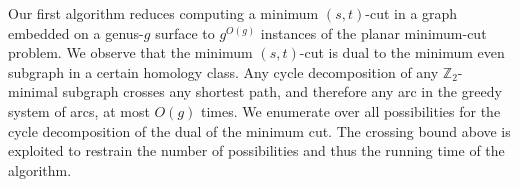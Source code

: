 \documentclass[natbib]{svcyclop}
\def\Z{\mathbb{Z}}
\begin{document}

Our first algorithm \cite{cen-mcshc-09} reduces computing a minimum $(s,t)$-cut in a graph embedded on a genus-$g$ surface to $g^{O(g)}$ instances of the planar minimum-cut problem.
We observe that the minimum $(s,t)$-cut is dual to the minimum even subgraph in a certain homology class.
Any cycle decomposition of any $\Z_2$-minimal subgraph crosses any shortest path, and therefore any arc in the greedy system of arcs, at most $O(g)$ times.  We enumerate over all possibilities for the cycle decomposition of the dual of the minimum cut.  The crossing bound above is exploited to restrain the number of possibilities and thus the running time of the algorithm.
\end{document}
